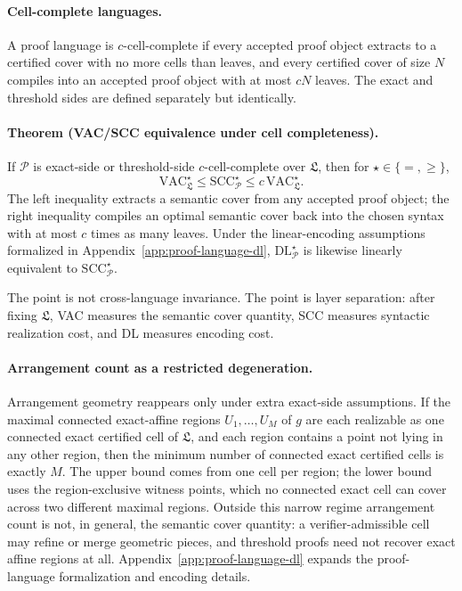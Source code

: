 \documentclass{article}
\begin{document}
\paragraph{Cell-complete languages.}
A proof language is $c$-cell-complete if every accepted proof object extracts to a certified cover with no more cells than leaves, and every certified cover of size $N$ compiles into an accepted proof object with at most $cN$ leaves. The exact and threshold sides are defined separately but identically.

\paragraph{Theorem (VAC/SCC equivalence under cell completeness).}
If $\mathcal P$ is exact-side or threshold-side $c$-cell-complete over $\mathfrak L$, then for $\star\in\{=,\ge\}$,
\[
\mathrm{VAC}^{\star}_{\mathfrak L}
\le
\mathrm{SCC}^{\star}_{\mathcal P}
\le
c\,\mathrm{VAC}^{\star}_{\mathfrak L}.
\]
The left inequality extracts a semantic cover from any accepted proof object; the right inequality compiles an optimal semantic cover back into the chosen syntax with at most $c$ times as many leaves. Under the linear-encoding assumptions formalized in Appendix~\ref{app:proof-language-dl}, $\mathrm{DL}^{\star}_{\mathcal P}$ is likewise linearly equivalent to $\mathrm{SCC}^{\star}_{\mathcal P}$.

The point is not cross-language invariance. The point is layer separation: after fixing $\mathfrak L$, VAC measures the semantic cover quantity, SCC measures syntactic realization cost, and DL measures encoding cost.

\paragraph{Arrangement count as a restricted degeneration.}\label{subsec:arrangement-degeneration}
Arrangement geometry reappears only under extra exact-side assumptions. If the maximal connected exact-affine regions $U_1,\dots,U_M$ of $g$ are each realizable as one connected exact certified cell of $\mathfrak L$, and each region contains a point not lying in any other region, then the minimum number of connected exact certified cells is exactly $M$. The upper bound comes from one cell per region; the lower bound uses the region-exclusive witness points, which no connected exact cell can cover across two different maximal regions. Outside this narrow regime arrangement count is not, in general, the semantic cover quantity: a verifier-admissible cell may refine or merge geometric pieces, and threshold proofs need not recover exact affine regions at all. Appendix~\ref{app:proof-language-dl} expands the proof-language formalization and encoding details.
\end{document}
